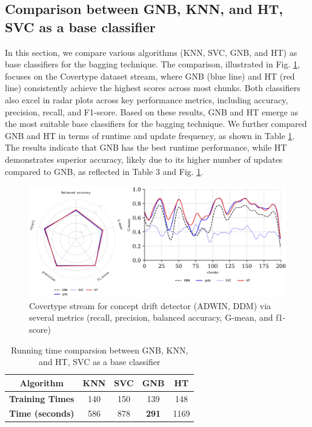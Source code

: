   \subsection{Comparison between GNB, KNN, and HT, SVC as a base classifier}
  In this section, we compare various algorithms (KNN, SVC, GNB, and HT) as base classifiers for the bagging technique. The comparison, illustrated in Fig. \ref{fig:5_result4}, focuses on the Covertype dataset stream, where GNB (blue line) and HT (red line) consistently achieve the highest scores across most chunks. Both classifiers also excel in radar plots across key performance metrics, including accuracy, precision, recall, and F1-score. Based on these results, GNB and HT emerge as the most suitable base classifiers for the bagging technique. We further compared GNB and HT in terms of runtime and update frequency, as shown in Table \ref{table:5_3}. The results indicate that GNB has the best runtime performance, while HT demonstrates superior accuracy, likely due to its higher number of updates compared to GNB, as reflected in Table 3 and Fig. \ref{fig:5_result4}.
  \begin{figure}[!ht]
    \centering
    \includegraphics[width=1\linewidth]{5_Emerging/figures/result4}
    \caption{Covertype stream for concept drift detector (ADWIN, DDM) via several metrics (recall, precision, balanced accuracy, G-mean, and f1-score)}
    \label{fig:5_result4}
  \end{figure}

  \begin{table}[h!]
    \centering
    \caption{Running time comparsion between GNB, KNN, and HT, SVC as a base classifier}
      \label{table:5_3}
    \begin{tabular}{|c|c|c|c|c|}
      
    \hline
    \textbf{Algorithm} & \textbf{KNN} & \textbf{SVC} & \textbf{GNB} & \textbf{HT} \\ \hline
    \textbf{Training Times} & 140 & 150 & 139 & 148 \\ \hline
    \textbf{Time (seconds)} & 586 & 878 & \textbf{291} & 1169 \\ \hline
    \end{tabular}
    \end{table}

